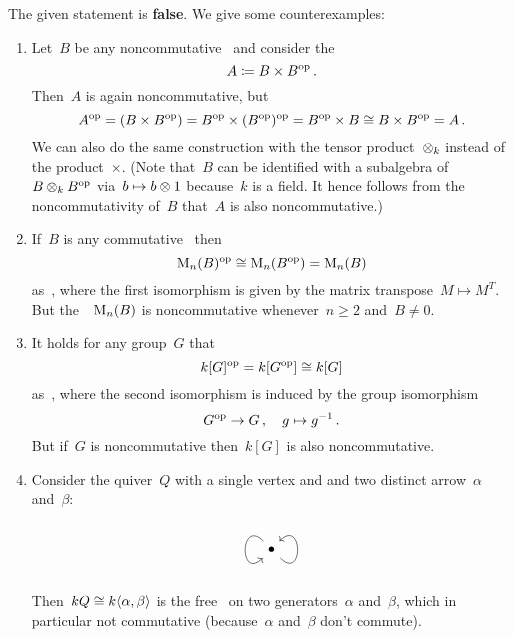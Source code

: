 \section{}


\subsection{}

The given statement is \textbf{false}.
We give some counterexamples:
\begin{enumerate}
  \item
    Let~$B$ be any noncommutative~{\kalg} and consider the~{\kalg}
    \[
                A
      \coloneqq  B \times B^{\mathrm{op}} \,.
    \]
    Then~$A$ is again noncommutative, but
    \[
            A^{\mathrm{op}}
      =     (B \times B^{\mathrm{op}})
      =     B^{\mathrm{op}} \times (B^{\mathrm{op}})^{\mathrm{op}}
      =     B^{\mathrm{op}} \times B
      \cong B \times B^{\mathrm{op}}
      =     A \,.
    \]
    We can also do the same construction with the tensor product~$\otimes_k$ instead of the product~$\times$.
    (Note that~$B$ can be identified with a subalgebra of~$B \otimes_k B^{\mathrm{op}}$ via~$b \mapsto b \otimes 1$ because~$k$ is a field.
    It hence follows from the noncommutativity of~$B$ that~$A$ is also noncommutative.)
  \item
    If~$B$ is any commutative~{\kalg} then
    \[
            \operatorname{M}_{n}(B)^{\mathrm{op}}
      \cong \operatorname{M}_{n}(B^{\mathrm{op}})
      =     \operatorname{M}_{n}(B)
    \]
    as~{\kalgs}, where the first isomorphism is given by the matrix transpose~$M \mapsto M^T$.
    But the~{\kalg}~$\operatorname{M}_{n}(B)$ is noncommutative whenever~$n \geq 2$ and~$B \neq 0$.
  \item
    It holds for any group~$G$ that
    \[
            k[G]^{\mathrm{op}}
      =     k[G^{\mathrm{op}}]
      \cong k[G]
    \]
    as~{\kalgs}, where the second isomorphism is induced by the group isomorphism
    \[
              G^{\mathrm{op}}
      \to     G \,,
      \quad   g
      \mapsto g^{-1} \,.
    \]
    But if~$G$ is noncommutative then~$k[G]$ is also noncommutative.
  \item
    Consider the quiver~$Q$ with a single vertex and and two distinct arrow~$\alpha$ and~$\beta$:
    \[
      \begin{tikzcd}
        \bullet
        \arrow[loop,out=315,in=405,looseness=5]
        \arrow[loop,out=135,in=225,looseness=5]
      \end{tikzcd}
    \]
    Then~$kQ \cong k\langle\alpha,\beta\rangle$ is the free~{\kalg} on two generators~$\alpha$ and~$\beta$, which in  particular not commutative (because~$\alpha$ and~$\beta$ don’t commute).

\end{enumerate}
